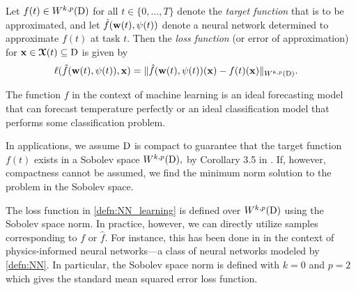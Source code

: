 \begin{definition}\label{defn:NN_learning}
        Let $f(t)\in W^{k,p}(\mathrm{D})$ for all $t\in \{0,\ldots, T\}$ denote the \textit{target function} that is to be approximated, and let $\hat{f}(\boldsymbol{\mathrm{w}}(t),\psi(t))$ denote a neural network determined to approximate $f(t)$ at task $t.$ Then the \textit{loss function} (or error of approximation) for $\boldsymbol{\mathrm{x}} \in \boldsymbol{\mathcal{X}}(t) \subseteq \mathrm{D}$ is given by 
        \begin{align*}
            \ell(\hat{f}(\boldsymbol{\mathrm{w}}(t),\psi(t)), \boldsymbol{\mathrm{x}}) & = \| \hat{f}(\boldsymbol{\mathrm{w}}(t),\psi(t))(\boldsymbol{\mathrm{x}})-f(t)(\boldsymbol{\mathrm{x}})\|_{W^{k,p}(\mathrm{D})}.
        \end{align*} 
\end{definition}
The function $f$ in the context of machine learning is an ideal forecasting model that can forecast temperature perfectly or an ideal classification model that performs some classification problem.
\begin{remark}
    In applications, we  assume $\mathrm{D}$ is compact to guarantee that the target function $f(t)$ exists in a Sobolev space $W^{k,p}(\mathrm{D}),$ by Corollary 3.5 in \cite{mahanNonclosednessSetsNeural2021a}. If, however,  compactness cannot be assumed, we find the minimum norm solution to the problem in the Sobolev space.
\end{remark}
The loss function in \cref{defn:NN_learning} is defined over $W^{k,p}(\mathrm{D})$ using the Sobolev space norm. In practice, however, we can directly utilize samples corresponding to $f$ or $\hat{f}.$ For instance, this has been done in \cite{son2021sobolev} in the context of  physics-informed neural networks---a class of neural networks  modeled by \cref{defn:NN}. In particular, the Sobolev space norm is defined with $k=0$ and $p=2$ which gives the standard mean squared error loss function.
